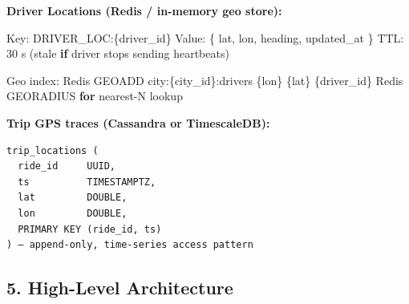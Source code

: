 \documentclass[11pt]{article}
\newenvironment{Shaded}{\begin{snugshade}}{\end{snugshade}}
\newcommand{\ControlFlowTok}[1]{\textcolor[rgb]{0.99,0.74,0.29}{\textbf{#1}}}
\newcommand{\DecValTok}[1]{\textcolor[rgb]{0.96,0.45,0.00}{#1}}
\newcommand{\NormalTok}[1]{\textcolor[rgb]{0.81,0.81,0.76}{#1}}
\newcommand{\OperatorTok}[1]{\textcolor[rgb]{0.81,0.81,0.76}{#1}}
\begin{document}
\textbf{Driver Locations (Redis / in-memory geo store):}


\begin{Shaded}
\begin{Highlighting}[]
\NormalTok{Key:   DRIVER\_LOC:\{driver\_id\}}
\NormalTok{Value: \{ lat, lon, heading, updated\_at \}}
\NormalTok{TTL:   }\DecValTok{30}\NormalTok{ s (stale }\ControlFlowTok{if}\NormalTok{ driver stops sending heartbeats)}

\NormalTok{Geo index: Redis GEOADD city:\{city\_id\}:drivers \{lon\} \{lat\} \{driver\_id\}}
\NormalTok{           Redis GEORADIUS }\ControlFlowTok{for}\NormalTok{ nearest}\OperatorTok{{-}}\NormalTok{N lookup}
\end{Highlighting}
\end{Shaded}

\textbf{Trip GPS traces (Cassandra or TimescaleDB):}

\setcodelang{}

\begin{verbatim}
trip_locations (
  ride_id     UUID,
  ts          TIMESTAMPTZ,
  lat         DOUBLE,
  lon         DOUBLE,
  PRIMARY KEY (ride_id, ts)
) — append-only, time-series access pattern
\end{verbatim}

\subsection{5. High-Level Architecture}\label{5-high-level-architecture-1}

\setcodelang{}
\end{document}

